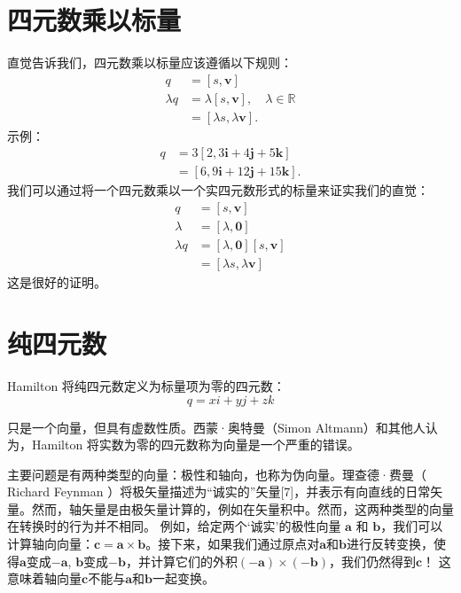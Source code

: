\section{四元数乘以标量}
直觉告诉我们，四元数乘以标量应该遵循以下规则：
$$
    \begin{aligned}
        q         & =[s, \mathbf{v}]                                      \\
        \lambda q & =\lambda[s, \mathbf{v}], \quad \lambda \in \mathbb{R} \\
                  & =[\lambda s, \lambda \mathbf{v}] .
    \end{aligned}
$$
示例：
$$
    \begin{aligned}
        q & =3[2,3 \mathbf{i}+4 \mathbf{j}+5 \mathbf{k}]    \\
          & =[6,9 \mathbf{i}+12 \mathbf{j}+15 \mathbf{k}] .
    \end{aligned}
$$
我们可以通过将一个四元数乘以一个实四元数形式的标量来证实我们的直觉：
$$
    \begin{aligned}
        q         & =[s,  \mathbf{v}]  \\
        \lambda   & =[\lambda, \mathbf{0}]  \\
        \lambda q & =[\lambda, \mathbf{0}  ][s, \mathbf{v}] \\
                  & =[\lambda s,  \lambda \mathbf{v}  ]
    \end{aligned}
$$
这是很好的证明。

\section{纯四元数}
Hamilton 将纯四元数定义为标量项为零的四元数：
$$
    q=x i+y j+z k
$$

只是一个向量，但具有虚数性质。西蒙·奥特曼（Simon Altmann）和其他人认为，Hamilton 将实数为零的四元数称为向量是一个严重的错误。

主要问题是有两种类型的向量：极性和轴向，也称为伪向量。理查德·费曼（ Richard Feynman ）将极矢量描述为“诚实的”矢量[7]，并表示有向直线的日常矢量。然而，轴矢量是由极矢量计算的，例如在矢量积中。然而，这两种类型的向量在转换时的行为并不相同。
例如，给定两个‘诚实’的极性向量 $\mathbf{a}$ 和 $\mathbf{b}$，我们可以计算轴向向量：$\mathbf{c}=\mathbf{a} \times \mathbf{b}$。接下来，如果我们通过原点对$\mathbf{a}$和$\mathbf{b}$进行反转变换，使得$\mathbf{a}$变成$-\mathbf{a}$, $\mathbf{b}$变成$-\mathbf{b}$，并计算它们的外积$(-\mathbf{a}) \times(-\mathbf{b})$，我们仍然得到$\mathbf{c}$！ 这意味着轴向量$\mathbf{c}$不能与$\mathbf{a}$和$\mathbf{b}$一起变换。

